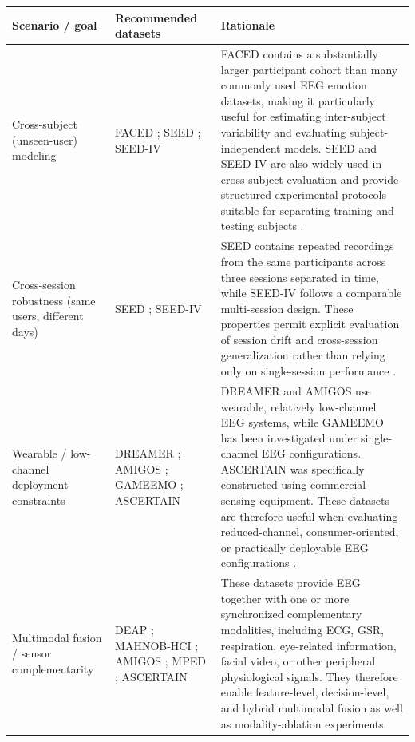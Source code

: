 \documentclass{WileyMSP-template}
\begin{document}
\begin{table}[H]
\centering
\footnotesize
\setlength{\tabcolsep}{4pt}
\renewcommand{\arraystretch}{1.25}
\begin{tabular}{|p{3.3cm}|p{4.6cm}|p{5.0cm}|}
\hline
\textbf{Scenario / goal} & \textbf{Recommended datasets} & \textbf{Rationale} \\
\hline

Cross-subject (unseen-user) modeling
&
FACED \cite{chen2023faced}; 
SEED \cite{zheng2015seed}; 
SEED-IV \cite{zheng2018emotionmeter}
&
FACED contains a substantially larger participant cohort than many commonly used EEG emotion datasets, making it particularly useful for estimating inter-subject variability and evaluating subject-independent models. SEED and SEED-IV are also widely used in cross-subject evaluation and provide structured experimental protocols suitable for separating training and testing subjects \cite{apicella2024neucom_systematic}. \\
\hline

Cross-session robustness (same users, different days)
&
SEED \cite{zheng2019stablepatterns}; 
SEED-IV \cite{chen2021msmda}
&
SEED contains repeated recordings from the same participants across three sessions separated in time, while SEED-IV follows a comparable multi-session design. These properties permit explicit evaluation of session drift and cross-session generalization rather than relying only on single-session performance \cite{apicella2024neucom_systematic}. \\
\hline

Wearable / low-channel deployment constraints
&
DREAMER \cite{katsigiannis2018dreamer}; 
AMIGOS \cite{amigos2018}; 
GAMEEMO \cite{alakus2021gameemo}; 
ASCERTAIN \cite{geng2025dlreview}
&
DREAMER and AMIGOS use wearable, relatively low-channel EEG systems, while GAMEEMO has been investigated under single-channel EEG configurations. ASCERTAIN was specifically constructed using commercial sensing equipment. These datasets are therefore useful when evaluating reduced-channel, consumer-oriented, or practically deployable EEG configurations \cite{dadebayev2022commercial}. \\
\hline

Multimodal fusion / sensor complementarity
&
DEAP \cite{koelstra2012deap}; 
MAHNOB-HCI \cite{soleymani2012mahnob}; 
AMIGOS \cite{amigos2018}; 
MPED \cite{song2019mped}; 
ASCERTAIN \cite{subramanian2018ascertain}
&
These datasets provide EEG together with one or more synchronized complementary modalities, including ECG, GSR, respiration, eye-related information, facial video, or other peripheral physiological signals. They therefore enable feature-level, decision-level, and hybrid multimodal fusion as well as modality-ablation experiments \cite{wang2024csur_researchprogress}. \\
\hline


\end{tabular}
\end{table}
\end{document}
